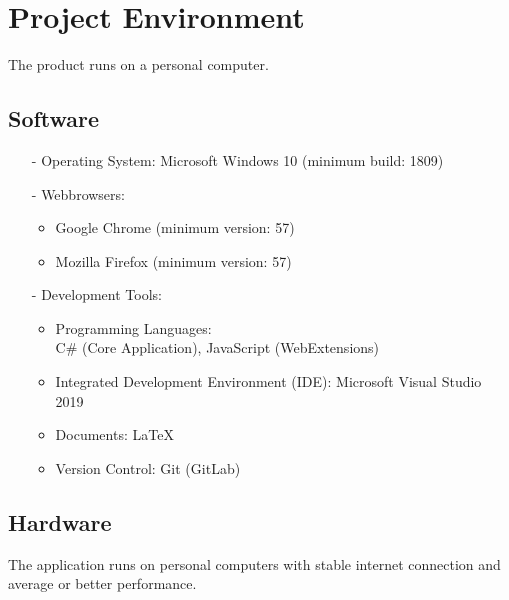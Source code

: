 \chapter{Project Environment}
\label{ch:environment}

The product runs on a personal computer.

\section{Software}
\begin{itemize}
\item[-] Operating System: Microsoft Windows 10 (minimum build: 1809)
\item[-] Webbrowsers:
	\begin{itemize}
	\item Google Chrome (minimum version: 57)
	\item Mozilla Firefox (minimum version: 57)
	\end{itemize}

\item[-] Development Tools:
	\begin{itemize}
	\item Programming Languages: \\C\# (Core Application), JavaScript (WebExtensions)
	\item Integrated Development Environment (IDE): Microsoft Visual Studio 2019
	\item Documents: LaTeX
	\item Version Control: Git (GitLab)
	\end{itemize}
\end{itemize}
\section{Hardware}

The application runs on personal computers with stable internet connection and average or better performance.
